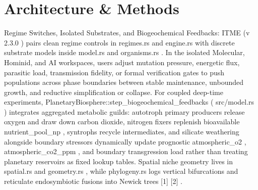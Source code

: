 \documentclass[10pt,letterpaper]{article}
\begin{document}
\section{Architecture \& Methods}
Regime Switches, Isolated Substrates, and Biogeochemical Feedbacks: ITME (v 2.3.0 ) pairs clean regime controls in regimes.rs and engine.rs with discrete substrate models inside model.rs and organisms.rs . In the isolated Molecular, Hominid, and AI workspaces, users adjust mutation pressure, energetic flux, parasitic load, transmission fidelity, or formal verification gates to push populations across phase boundaries between stable maintenance, unbounded growth, and reductive simplification or collapse. For coupled deep-time experiments, PlanetaryBiosphere::step\_biogeochemical\_feedbacks ( src/model.rs ) integrates aggregated metabolic guilds: autotroph primary producers release oxygen and draw down carbon dioxide, nitrogen fixers replenish bioavailable nutrient\_pool\_np , syntrophs recycle intermediates, and silicate weathering alongside boundary stressors dynamically update prognostic atmospheric\_o2 , atmospheric\_co2\_ppm , and boundary transgression load rather than treating planetary reservoirs as fixed lookup tables. Spatial niche geometry lives in spatial.rs and geometry.rs , while phylogeny.rs logs vertical bifurcations and reticulate endosymbiotic fusions into Newick trees [1] [2] .
\end{document}
